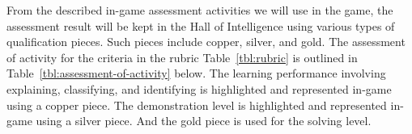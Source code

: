 \documentclass[12pt,oneside,openright,a4paper]{cpe-english-project}
\begin{document}
From the described in-game assessment activities we will use in the game, the assessment result will be kept in the Hall of Intelligence using various types of qualification pieces. Such pieces include copper, silver, and gold. The assessment of activity for the criteria in the rubric Table~\ref{tbl:rubric} is outlined in Table~\ref{tbl:assessment-of-activity} below. The learning performance involving explaining, classifying, and identifying is highlighted and represented in-game using a copper piece. The demonstration level is highlighted and represented in-game using a silver piece. And the gold piece is used for the solving level.

\end{document}

